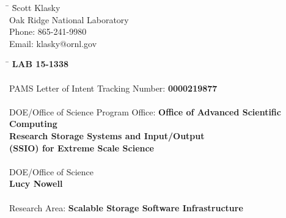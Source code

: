 
\begin{tabbing}
\hspace*{10mm} \=  \= Scott Klasky \\
\> \> Oak Ridge National Laboratory \\
\> \> Phone: 865-241-9980 \\
\> \> Email: klasky@ornl.gov
\end{tabbing}


\begin{tabbing}
\hspace*{10mm} \=  \= \textbf{LAB 15-1338}\\
\\
\> {PAMS Letter of Intent Tracking Number:}			    \> \textbf{0000219877}\\
\\
\> {DOE/Office of Science Program Office:} \> \textbf{Office of Advanced Scientific Computing}\\
\>									    \> \textbf{Research Storage Systems and Input/Output}\\
\>									    \> \textbf{(SSIO) for Extreme Scale Science}\\
\\
\> {DOE/Office of Science}  \> \\
\>  \>  \textbf{Lucy Nowell}\\
\\
\> {Research Area:} \>\textbf{Scalable Storage Software Infrastructure}

\end{tabbing}




\newpage